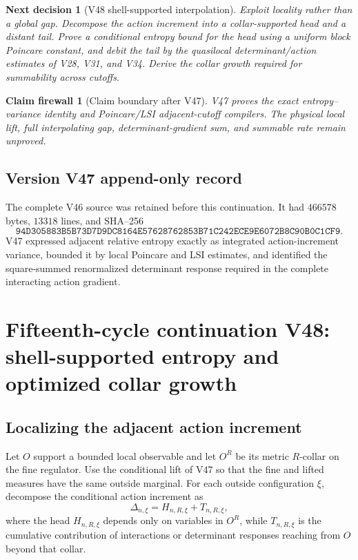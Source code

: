\documentclass[11pt]{article}
\newtheorem{firewall}[theorem]{Claim firewall}
\newtheorem{decision}[theorem]{Next decision}
\theoremstyle{remark}
\begin{document}
\begin{decision}[V48 shell-supported interpolation]
\label{dec:v15v47-next}
Exploit locality rather than a global gap.  Decompose the action
increment into a collar-supported head and a distant tail.  Prove a
conditional entropy bound for the head using a uniform block
Poincare constant, and debit the tail by the quasilocal
determinant/action estimates of V28, V31, and V34.  Derive the
collar growth required for summability across cutoffs.
\end{decision}

\begin{firewall}[Claim boundary after V47]
\label{fire:v15v47}
V47 proves the exact entropy--variance identity and Poincare/LSI
adjacent-cutoff compilers.  The physical local lift, full
interpolating gap, determinant-gradient sum, and summable rate
remain unproved.
\end{firewall}

\section*{Version V47 append-only record}
The complete V46 source was retained before this continuation.  It
had \(466578\) bytes, \(13318\) lines, and SHA--256
\[
 \texttt{94D305883B5B73D7D9DC8164E57628762853B71C242ECE9E6072B8C90B0C1CF9}.
\]
V47 expressed adjacent relative entropy exactly as integrated
action-increment variance, bounded it by local Poincare and LSI
estimates, and identified the square-summed renormalized determinant
response required in the complete interacting action gradient.

\chapter{Fifteenth-cycle continuation V48: shell-supported entropy and optimized collar growth}
\label{sec:v15v48}

\section{Localizing the adjacent action increment}

Let \(O\) support a bounded local observable and let \(O^R\) be its
metric \(R\)-collar on the fine regulator.  Use the conditional lift
of V47 so that the fine and lifted measures have the same outside
marginal.  For each outside configuration \(\xi\), decompose the
conditional action increment as
\[
 \Delta_{n,\xi}=H_{n,R,\xi}+T_{n,R,\xi},                 \tag{48.1}
\]
where the head \(H_{n,R,\xi}\) depends only on variables in
\(O^R\), while \(T_{n,R,\xi}\) is the cumulative contribution of
interactions or determinant responses reaching from \(O\) beyond
that collar.
\end{document}
